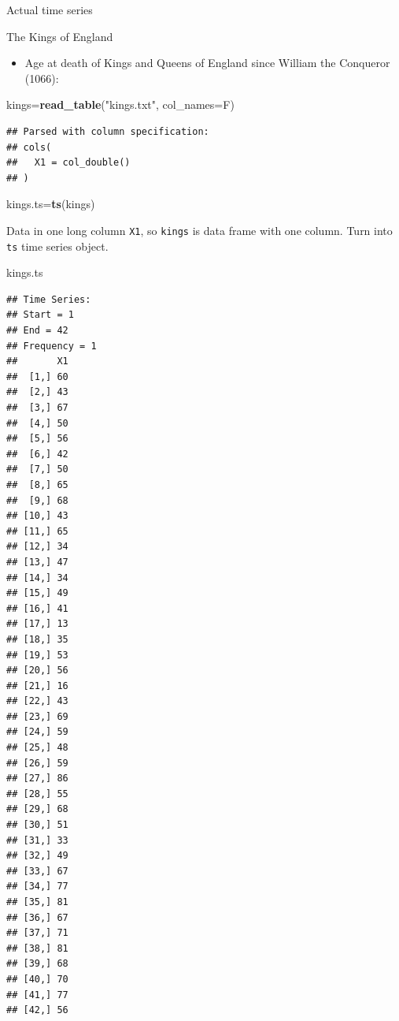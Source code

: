 \documentclass[ignorenonframetext,]{beamer}
\newenvironment{Shaded}{\begin{snugshade}}{\end{snugshade}}
\newcommand{\DataTypeTok}[1]{\textcolor[rgb]{0.13,0.29,0.53}{#1}}
\newcommand{\KeywordTok}[1]{\textcolor[rgb]{0.13,0.29,0.53}{\textbf{#1}}}
\newcommand{\NormalTok}[1]{#1}
\newcommand{\StringTok}[1]{\textcolor[rgb]{0.31,0.60,0.02}{#1}}
\providecommand{\tightlist}{%
  \setlength{\itemsep}{0pt}\setlength{\parskip}{0pt}}
\begin{document}
\begin{frame}[fragile]{Actual time series}
\protect\hypertarget{actual-time-series}{}

\begin{block}{The Kings of England}

\begin{itemize}
\tightlist
\item
  Age at death of Kings and Queens of England since William the
  Conqueror (1066):
\end{itemize}

\begin{Shaded}
\begin{Highlighting}[]
\NormalTok{kings=}\KeywordTok{read_table}\NormalTok{(}\StringTok{"kings.txt"}\NormalTok{, }\DataTypeTok{col_names=}\NormalTok{F)}
\end{Highlighting}
\end{Shaded}

\begin{verbatim}
## Parsed with column specification:
## cols(
##   X1 = col_double()
## )
\end{verbatim}

\begin{Shaded}
\begin{Highlighting}[]
\NormalTok{kings.ts=}\KeywordTok{ts}\NormalTok{(kings)}
\end{Highlighting}
\end{Shaded}

Data in one long column \texttt{X1}, so \texttt{kings} is data frame
with one column. Turn into \texttt{ts} time series object.

\begin{Shaded}
\begin{Highlighting}[]
\NormalTok{kings.ts}
\end{Highlighting}
\end{Shaded}

\begin{verbatim}
## Time Series:
## Start = 1 
## End = 42 
## Frequency = 1 
##       X1
##  [1,] 60
##  [2,] 43
##  [3,] 67
##  [4,] 50
##  [5,] 56
##  [6,] 42
##  [7,] 50
##  [8,] 65
##  [9,] 68
## [10,] 43
## [11,] 65
## [12,] 34
## [13,] 47
## [14,] 34
## [15,] 49
## [16,] 41
## [17,] 13
## [18,] 35
## [19,] 53
## [20,] 56
## [21,] 16
## [22,] 43
## [23,] 69
## [24,] 59
## [25,] 48
## [26,] 59
## [27,] 86
## [28,] 55
## [29,] 68
## [30,] 51
## [31,] 33
## [32,] 49
## [33,] 67
## [34,] 77
## [35,] 81
## [36,] 67
## [37,] 71
## [38,] 81
## [39,] 68
## [40,] 70
## [41,] 77
## [42,] 56
\end{verbatim}


\end{block}
\end{frame}
\end{document}
